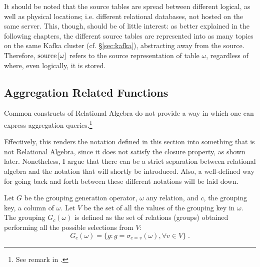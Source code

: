 It should be noted that the source tables are spread between different logical, as well as physical locations; i.e. different relational databases, not hosted on the same server.
This, though, should be of little interest: as better explained in the following chapters, the different source tables are represented into as many topics on the same Kafka cluster (cf. \S \ref{sec:kafka}), abstracting away from the source.
Therefore, $\text{source}\left[{\omega}\right]$ refers to the source representation of table $\omega$, regardless of where, even logically, it is stored.


\subsection{Aggregation Related Functions}
\label{sec:notation-aggregation}

Common constructs of Relational Algebra do not provide a way in which one can express aggregation queries.\footnote{%
See remark in \cite[p.~154]{dbms}.
}

Effectively, this renders the notation defined in this section into something that is not Relational Algebra, since it does not satisfy the closure property, as shown later.
Nonetheless, I argue that there can be a strict separation between relational algebra and the notation that will shortly be introduced.
Also, a well-defined way for going back and forth between these different notations will be laid down.

\begin{definition}\label{def:G}
Let $G$ be the grouping generation operator, $\omega$ any relation, and $c$, the grouping key, a column of $\omega$.
Let $V$ be the set of all the values of the grouping key in $\omega$.
The grouping $G_c(\omega)$ is defined as the set of relations (groups) obtained performing all the possible selections from $V$:
$$
G_c(\omega) = \{
    g : g = \sigma_{c = v}(\omega), \forall v \in V
\} \; .
$$
\end{definition}

